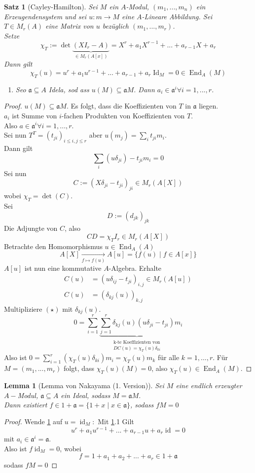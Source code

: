 \documentclass[10pt,a4paper]{article}
\newcommand{\End}{\operatorname{End}}
\newcommand{\id}{\operatorname{id}}
\newcounter{thm}[section]
\theoremstyle{definition}
\theoremstyle{plain}
\newtheorem{lem}[thm]{Lemma}
\newtheorem{satz}[thm]{Satz}
\theoremstyle{remark}
\begin{document}
\begin{satz}[Cayley-Hamilton]
	\label{423CayHam}
	Sei $M$ ein $A$-Modul, $(m_1,...,m_n)$ ein Erzeugendensystem und sei $u:m\rightarrow M$ eine $A$-Lineare Abbildung. Sei $T\in M_r(A)$ eine Matrix von $u$ bezüglich $(m_1,...,m_r)$.\\
	Setze
	\[\chi_T:=\det\underbrace{(X I_r-A)}_{\in M_r(A[x])}=X^r+a_1X^{r-1}+...+a_{r-1}X+a_r\]
	Dann gilt
	\[\chi_T(u)=u^r+a_1u^{r-1}+...+a_{r-1}+a_r\operatorname{Id}_M=0\in\operatorname{End}_A(M)\]
	\begin{enumerate}
		\item Seo $\mathfrak a\subseteq A$ Idela, sod ass $u(M)\subseteq\mathfrak aM$. Dann $a_i\in\mathfrak a^i\forall i=1,...,r$.
	\end{enumerate}
\end{satz}
\begin{proof}
	$u(M)\subseteq\mathfrak aM$. Es folgt, dass die Koeffizienten von $T$ in $\mathfrak a$ liegen.\\
	$a_i$ ist Summe von $i$-fachen Produkten von Koeffizienten von $T$.\\
	Also $a\in\mathfrak a^i\forall i=1,...,r$.\\
	Sei nun $T^T=(t_{ji})_{i\le i,j\le r}$ aber $u(m_j)=\sum_{i}t_{ji}m_i$.\\
	Dann gilt
	\[\sum_i(u\delta_{ji})-t_{ji}m_i=0\]
	Sei nun
	\[C:=(X\delta_{ji}-t_{ji})_{ji}\in M_r(A[X])\]
	wobei $\chi_T=\det(C)$.\\
	Sei
	\[D:=(d_{jk})_{jk}\]
	Die Adjungte von $C$, also
	\[CD=\chi_TI_r\in M_r(A[X])\tag{$\star\star$}\]
	Betrachte den Homomorphismus $u\in\End_A(A)$
	\[A[X]\xrightarrow[f\mapsto f(u)]{}A[u]=\{f(u)\mid f\in A[x] \}\]
	$A[u]$ ist nun eine kommutative $A$-Algebra. Erhalte
	\begin{align*}
	C(u)&=(u\delta_{ij}-t_{ji})_{i,j}\in M_r(A[u])\\
	C(u)&=(\delta_{kj}(u))_{k,j}
	\end{align*}
	Multipliziere $(\star)$ mit $\delta_{kj}(u)$.
	\[0=\sum_{i=1}^{r}\underbrace{\sum_{j=1}^{r}\delta_{kj}(u)(u\delta_{ji}-t_{ji})}_{\substack{\text{k-te Koeffizienten von}\\DC(u)=\chi_T(u)\delta_{ki}}}m_i\]
	Also ist $0=\sum_{i=1}^{r}(\chi_T(u)\delta_{ki})m_i=\chi_T(u)m_k$ für alle $k=1,...,r$. Für $M=(m_1,...,m_r)$ folgt, dass $\chi_T(u)(M)=0$, also $\chi_T(u)\in\End_A(M)$.
\end{proof}

\begin{lem}[Lemma von Nakayama (1. Version)] \label{424Nakayama1}
	Sei $M$ eine endlich erzeugter $A-$Modul, $\mathfrak a\subseteq A$ ein Ideal, sodass $M=\mathfrak aM$.\\
	Dann existiert $f\in1+\mathfrak a=\{1+x\mid x\in \mathfrak a\}$, sodass $fM=0$
\end{lem}
\begin{proof}
	Wende \ref{423CayHam} auf $u=\id_M:$
	Mit \ref{423CayHam}.1 Gilt
	\[u^r+a_1u^{r-1}+...+a_{r-1}u+a_r\id=0\]
	mit $a_i\in\mathfrak a^i=\mathfrak a$.\\
	Also ist $f\id_M=0$, wobei
	\[f=1+a_1+a_2+...+a_r\in 1+\mathfrak a\]
	sodass $fM=0$
\end{proof}
\end{document}
